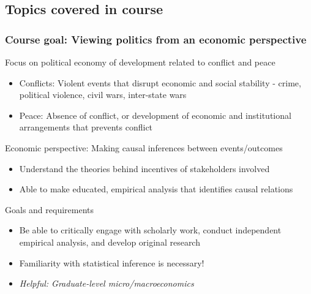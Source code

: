 \documentclass[aspectratio=169]{beamer}
\newenvironment{wideitemize}{\itemize\addtolength{\itemsep}{10pt}}{\enditemize}
\begin{document}
\subsection{Topics covered in course}
\begin{frame}
\frametitle{Course goal: Viewing politics from an economic perspective} 
\begin{wideitemize}
\item Focus on political economy of development related to conflict and peace
\begin{itemize}
\item Conflicts: Violent events that disrupt economic and social stability - crime, political violence, civil wars, inter-state wars
\item Peace: Absence of conflict, or development of economic and institutional arrangements that prevents conflict
\end{itemize}
\item Economic perspective: Making causal inferences between events/outcomes
\begin{itemize}
\item Understand the theories behind incentives of stakeholders involved
\item Able to make educated, empirical analysis that identifies causal relations
\end{itemize}
\item Goals and requirements
\begin{itemize}
\item Be able to critically engage with scholarly work, conduct independent empirical analysis, and develop original research
\item Familiarity with statistical inference is necessary!
\item \textit{Helpful: Graduate-level micro/macroeconomics}
\end{itemize}
\end{wideitemize}
\end{frame}
\end{document}
